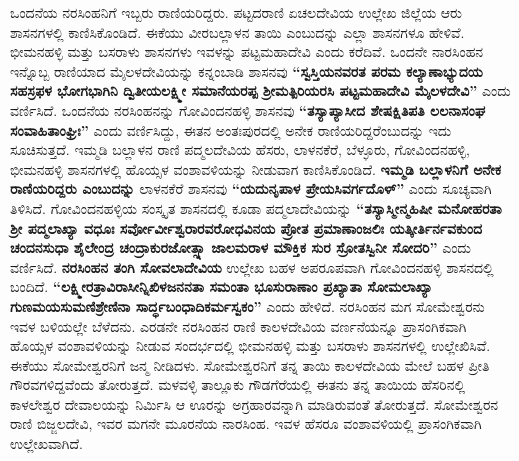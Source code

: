 ಒಂದನೆಯ ನರಸಿಂಹನಿಗೆ ಇಬ್ಬರು ರಾಣಿಯರಿದ್ದರು. ಪಟ್ಟದರಾಣಿ ಏಚಲದೇವಿಯ ಉಲ್ಲೇಖ ಜಿಲ್ಲೆಯ ಆರು ಶಾಸನಗಳಲ್ಲಿ ಕಾಣಿಸಿಕೊಂಡಿದೆ. ಈಕೆಯು ವೀರಬಲ್ಲಾಳನ ತಾಯಿ ಎಂಬುದನ್ನು ಎಲ್ಲಾ ಶಾಸನಗಳೂ ಹೇಳಿವೆ. ಭೀಮನಹಳ್ಳಿ ಮತ್ತು ಬಸರಾಳು ಶಾಸನಗಳು ಇವಳನ್ನು ಪಟ್ಟಮಹಾದೇವಿ ಎಂದು ಕರೆದಿವೆ. ಒಂದನೇ ನಾರಸಿಂಹನ ಇನ್ನೊಬ್ಬ ರಾಣಿಯಾದ ಮೈಲಳದೇವಿಯನ್ನು ಕನ್ನಂಬಾಡಿ ಶಾಸನವು \textbf{“ಸ್ವಸ್ತಿಯನವರತ ಪರಮ ಕಲ್ಯಾಣಾಭ್ಯುದಯ ಸಹಸ್ರಫಳ ಭೋಗಭಾಗಿನಿ ದ್ವಿತೀಯಲಕ್ಷ್ಮೀ ಸಮಾನೆಯರಪ್ಪ ಶ‍್ರೀಮತ್ಪಿರಿಯರಸಿ ಪಟ್ಟಮಹಾದೇವಿ ಮೈಲಳದೇವಿ”} ಎಂದು ವರ್ಣಿಸಿದೆ. ಒಂದನೆಯ ನರಸಿಂಹನನ್ನು ಗೋವಿಂದನಹಳ್ಳಿ ಶಾಸನವು \textbf{“ತಸ್ಯಾಪ್ಯಾಸೀದ ಶೇಷಕ್ಷಿತಿಪತಿ ಲಲನಾಸಂಘ ಸಂವಾಹಿತಾಂಘ್ರಿಃ”} ಎಂದು ವರ್ಣಿಸಿದ್ದು, ಈತನ ಅಂತಃಪುರದಲ್ಲಿ ಅನೇಕ ರಾಣಿಯರಿದ್ದರೆಂಬುದನ್ನು ಇದು ಸೂಚಿಸುತ್ತದೆ. ಇಮ್ಮಡಿ ಬಲ್ಲಾಳನ ರಾಣಿ ಪದ್ಮಲದೇವಿಯ ಹೆಸರು, ಲಾಳನಕೆರೆ, ಬೆಳ್ಳೂರು, ಗೋವಿಂದನಹಳ್ಳಿ, ಭೀಮನಹಳ್ಳಿ ಶಾಸನಗಳಲ್ಲಿ ಹೊಯ್ಸಳ ವಂಶಾವಳಿಯನ್ನು ನೀಡುವಾಗ ಕಾಣಿಸಿಕೊಂಡಿದೆ. \textbf{ಇಮ್ಮಡಿ ಬಲ್ಲಾಳನಿಗೆ ಅನೇಕ ರಾಣಿಯರಿದ್ದರು ಎಂಬುದನ್ನು} ಲಾಳನಕೆರೆ ಶಾಸನವು \textbf{“ಯದುನೃಪಾಳ ಪ್ರೇಯಸಿವರ್ಗದೊಳ್​”} ಎಂದು ಸೂಚ್ಯವಾಗಿ ತಿಳಿಸಿದೆ. ಗೋವಿಂದನಹಳ್ಳಿಯ ಸಂಸ್ಕೃತ ಶಾಸನದಲ್ಲಿ ಕೂಡಾ ಪದ್ಮಲಾದೇವಿಯನ್ನು \textbf{“ತಸ್ಯಾಸ್ಮೀನ್ಮಹಿಷೀ ಮನೋಹರತಾ ಶ‍್ರೀ ಪದ್ಮಲಾಖ್ಯಾ ವಧೂಃ ಸರ್ವೋರ್ವೀಶ್ವರಾರವರೋಧ\-ವಿನಯ ಪ್ರೋತ ಪ್ರಮಾಣಾಂಜಲಿಃ ಯತ್ಕೀರ್ತಿರ್ನವಕುಂದ ಚಂದನಸುಧಾ ಶೈಲೇಂದ್ರ ಚಂದ್ರಾಕುರಜೋತ್ಸ್ನಾ ಜಾಲಮರಾಳ ಮೌಕ್ತಿಕ ಸುರ ಸ್ರೋತಸ್ವಿನೀ ಸೋದರಿ”} ಎಂದು ವರ್ಣಿಸಿದೆ. \textbf{ನರಸಿಂಹನ ತಂಗಿ ಸೋವಲಾದೇವಿಯ} ಉಲ್ಲೇಖ ಬಹಳ ಅಪರೂಪವಾಗಿ ಗೋವಿಂದನಹಳ್ಳಿ ಶಾಸನದಲ್ಲಿ ಬಂದಿದೆ. \textbf{“ಲಕ್ಷ್ಮೀರತ್ರಾವಿರಾಸೀನ್ನಿಖಿಳಜನನತಾ ಸಮಂತಾ ಭೂಸುರಾಣಾಂ ಪ್ರಖ್ಯಾತಾ ಸೋಮಲಾಖ್ಯಾ ಗುಣಮಯಸುಮಣಿಶ್ರೇಣಿನಾ ಸಾರ್ದ್ಧಬಂಧಾದಿಕರ್ಮಸ್ವಕಂ”} ಎಂದು ಹೇಳಿದೆ. ನರಸಿಂಹನ ಮಗ ಸೋಮೇಶ್ವರನು ಇವಳ ಬಳಿಯಲ್ಲೇ ಬೆಳೆದನು. ಎರಡನೇ ನರಸಿಂಹನ ರಾಣಿ ಕಾಲಳದೇವಿಯ ವರ್ಣನೆಯನ್ನೂ ಪ್ರಾಸಂಗಿಕವಾಗಿ ಹೊಯ್ಸಳ ವಂಶಾವಳಿಯನ್ನು ನೀಡುವ ಸಂದರ್ಭದಲ್ಲಿ ಭೀಮನಹಳ್ಳಿ ಮತ್ತು ಬಸರಾಳು ಶಾಸನಗಳಲ್ಲಿ ಉಲ್ಲೇಖಿಸಿವೆ. ಈಕೆಯು ಸೋಮೇಶ್ವರನಿಗೆ ಜನ್ಮ ನೀಡಿದಳು. ಸೋಮೇಶ್ವರನಿಗೆ ತನ್ನ ತಾಯಿ ಕಾಲಳದೇವಿಯ ಮೇಲೆ ಬಹಳ ಪ್ರೀತಿ ಗೌರವಗಳಿದ್ದವೆಂದು ತೋರುತ್ತದೆ. ಮಳವಳ್ಳಿ ತಾಲ್ಲೂಕು ಗೌಡಗೆರೆಯಲ್ಲಿ ಈತನು ತನ್ನ ತಾಯಿಯ ಹೆಸರಿನಲ್ಲಿ ಕಾಳಲೇಶ್ವರ ದೇವಾಲಯನ್ನು ನಿರ್ಮಿಸಿ ಆ ಊರನ್ನು ಅಗ್ರಹಾರವನ್ನಾಗಿ ಮಾಡಿರುವಂತೆ ತೋರುತ್ತದೆ. ಸೋಮೇಶ್ವರನ ರಾಣಿ ಬಿಜ್ಜಲದೇವಿ, ಇವರ ಮಗನೇ ಮೂರನೆಯ ನಾರಸಿಂಹ. ಇವಳ ಹೆಸರೂ ವಂಶಾವಳಿಯಲ್ಲಿ ಪ್ರಾಸಂಗಿಕವಾಗಿ ಉಲ್ಲೇಖವಾಗಿದೆ.
